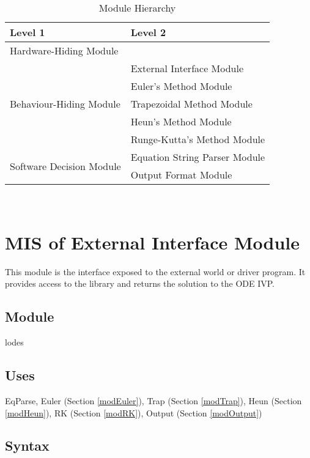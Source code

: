 \documentclass[12pt, titlepage]{article}
\begin{document}
\begin{table}[h!]
\centering
\begin{tabular}{p{} p{}}
\toprule
\textbf{Level 1} & \textbf{Level 2}\\
\midrule

{Hardware-Hiding Module} & ~ \\
\midrule

\multirow{5}{0.3\textwidth}{Behaviour-Hiding Module} & External Interface Module\\
& Euler's Method Module\\
& Trapezoidal Method Module\\
& Heun's Method Module\\
& Runge-Kutta's Method Module\\
\midrule

\multirow{2}{0.3\textwidth}{Software Decision Module} & {Equation String Parser Module}\\
& Output Format Module\\
\bottomrule

\end{tabular}
\caption{Module Hierarchy}
\label{TblMH}
\end{table}

\newpage
~\newpage

\section{MIS of External Interface Module} \label{modExternalInterface}
This module is the interface exposed to the external world or driver program.
It provides access to the library and returns the solution to the ODE IVP.

\subsection{Module}
lodes


\subsection{Uses}

EqParse, Euler (Section \ref{modEuler}), Trap (Section \ref{modTrap}),
Heun (Section \ref{modHeun}), RK (Section \ref{modRK}), Output (Section \ref{modOutput})

\subsection{Syntax}
\end{document}

